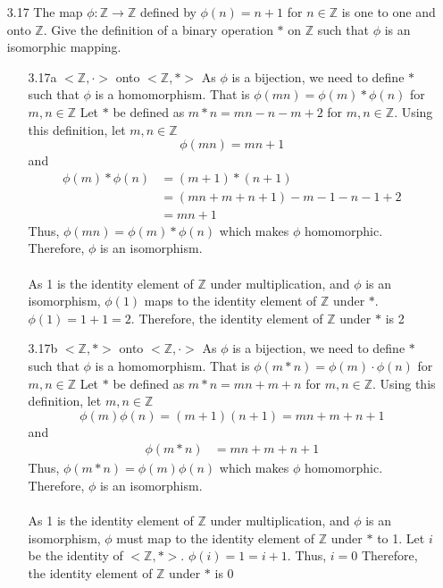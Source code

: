 \documentclass[12pt]{article}
\newcommand{\Z}{\mathds{Z}}
\begin{document}
\begin{enumerate}
\begin{enumerate}
			\item[3.17] The map $\phi: \Z \rightarrow \Z$ defined by $\phi(n)=n+1$ for $n \in \Z$ is one to one and onto $\Z$. Give the definition of a binary operation $\ast$ on $\Z$ such that $\phi$ is an isomorphic mapping.
			\begin{enumerate}
				\item[3.17a] $<\Z,\cdot>$ onto $<\Z,*>$
				As $ \phi $ is a bijection, we need to define $ * $ such that $ \phi $ is a homomorphism. That is $ \phi(mn)=\phi(m)*\phi(n) $ for $ m,n \in\Z $
				Let $ * $ be defined as $ m*n = mn-n-m+2$ for $ m,n\in\Z $. Using this definition, let $ m,n\in\Z $
				\[\phi(mn)=mn+1\] and
				\begin{align*}
					\phi(m)*\phi(n) &= (m+1)*(n+1)\\
					&= (mn+m+n+1)-m-1-n-1+2\\
					&= mn+1
				\end{align*}
				Thus, $ \phi(mn)=\phi(m)*\phi(n) $ which makes $ \phi $ homomorphic.\\
				Therefore, $ \phi $ is an isomorphism.\\
				\\
				As 1 is the identity element of $\Z$  under multiplication, and $ \phi $ is an isomorphism, $ \phi(1) $ maps to the identity element of $ \Z $ under $ * $. $ \phi(1) = 1+1=2 $. Therefore, the identity element of $ \Z $ under $ * $ is 2
				
				\item[3.17b] $<\Z,*>$ onto $<\Z,\cdot>$
				As $ \phi $ is a bijection, we need to define $ * $ such that $ \phi $ is a homomorphism. That is $ \phi(m*n)=\phi(m)\cdot\phi(n) $ for $ m,n \in\Z $
				Let $ * $ be defined as $ m*n = mn+m+n$ for $ m,n\in\Z $. Using this definition, let $ m,n\in\Z $
				\[\phi(m)\phi(n)=(m+1)(n+1)=mn+m+n+1\] and
				\begin{align*}
					\phi(m * n) &= mn+m+n+1
				\end{align*}
				Thus, $ \phi(m*n)=\phi(m)\phi(n) $ which makes $ \phi $ homomorphic.\\
				Therefore, $ \phi $ is an isomorphism.\\
				\\
				As 1 is the identity element of $\Z$  under multiplication, and $ \phi $ is an isomorphism, $ \phi $ must map to the identity element of $ \Z $ under $ * $ to 1. Let $i$ be the identity of $<\Z,*>$. $ \phi(i) = 1 = i +1 $. Thus, $i=0$ Therefore, the identity element of $ \Z $ under $ * $ is 0
			\end{enumerate}
			

\end{enumerate}
\end{enumerate}
\end{document}
